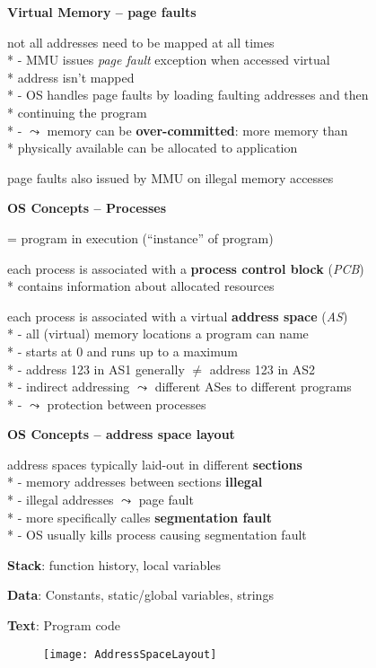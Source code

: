 \textbf{Virtual Memory -- page faults}
\begin{items}
	\item not all addresses need to be mapped at all times
		\\*
		- MMU issues \emph{page fault} exception when accessed virtual \\* \phantom{-} address isn't mapped
		\\*
		- OS handles page faults by loading faulting addresses and then \\* \phantom{-} continuing the program
		\\*
		- \( \leadsto \) memory can be \textbf{over-committed}: more memory than \\* \phantom{-} physically available can be allocated to application
	\item page faults also issued by MMU on illegal memory accesses
\end{items}

\textbf{OS Concepts -- Processes}
\begin{items}
	\item = program in execution ("`instance"' of program)
	\item each process is associated with a \textbf{process control block} (\emph{PCB})
		\\*
		contains information about allocated resources
	\item each process is associated with a virtual \textbf{address space} (\emph{AS})
		\\*
		- all (virtual) memory locations a program can name
		\\*
		- starts at 0 and runs up to a maximum
		\\*
		- address 123 in AS1 generally \( \neq \) address 123 in AS2
		\\*
		- indirect addressing \( \leadsto \) different ASes to different programs
		\\*
		- \( \leadsto \) protection between processes
\end{items}

\newpage

\textbf{OS Concepts -- address space layout}
\begin{items}
	\item address spaces typically laid-out in different \textbf{sections}
		\\*
		- memory addresses between sections \textbf{illegal}
		\\*
		- illegal addresses \( \leadsto \) page fault
		\\*
		- more specifically calles \textbf{segmentation fault}
		\\*
		- OS usually kills process causing segmentation fault
	\item \textbf{Stack}: function history, local variables
	\item \textbf{Data}: Constants, static/global variables, strings
	\item \textbf{Text}: Program code
	\begin{figure}[H]\centering\label{AddressSpaceLayout}\texttt{[image: AddressSpaceLayout]}\end{figure}
\end{items}

